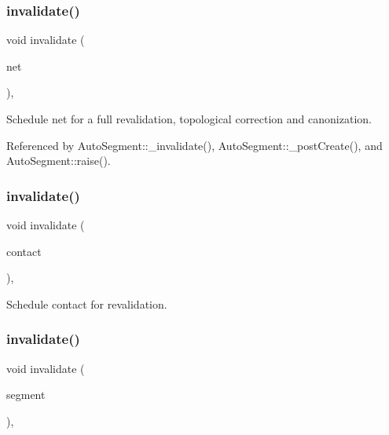 \subsubsection{\texorpdfstring{invalidate()}{invalidate()}\hspace{0.1cm}{\footnotesize\ttfamily [1/3]}}
{\footnotesize\ttfamily void invalidate (\begin{DoxyParamCaption}\item[{\textbf{ Net} $\ast$}]{net }\end{DoxyParamCaption})\hspace{0.3cm}{\ttfamily [inline]}, {\ttfamily [static]}}

Schedule {\ttfamily net} for a full revalidation, topological correction and canonization. 

Referenced by Auto\+Segment\+::\+\_\+invalidate(), Auto\+Segment\+::\+\_\+post\+Create(), and Auto\+Segment\+::raise().

\mbox{\label{classKatabatic_1_1Session_a1f8da0ae3a9d714c1dfae69904acec5f}} 
\subsubsection{\texorpdfstring{invalidate()}{invalidate()}\hspace{0.1cm}{\footnotesize\ttfamily [2/3]}}
{\footnotesize\ttfamily void invalidate (\begin{DoxyParamCaption}\item[{\hyperlink{classKatabatic_1_1AutoContact}{Auto\+Contact} $\ast$}]{contact }\end{DoxyParamCaption})\hspace{0.3cm}{\ttfamily [inline]}, {\ttfamily [static]}}

Schedule {\ttfamily contact} for revalidation. \mbox{\label{classKatabatic_1_1Session_a7968875ccb5abb2c6f6d5dec92027550}} 
\subsubsection{\texorpdfstring{invalidate()}{invalidate()}\hspace{0.1cm}{\footnotesize\ttfamily [3/3]}}
{\footnotesize\ttfamily void invalidate (\begin{DoxyParamCaption}\item[{\hyperlink{classKatabatic_1_1AutoSegment}{Auto\+Segment} $\ast$}]{segment }\end{DoxyParamCaption})\hspace{0.3cm}{\ttfamily [inline]}, {\ttfamily [static]}}

